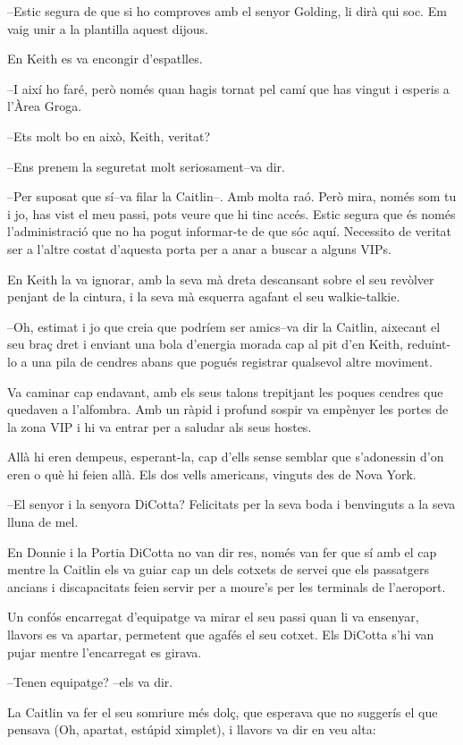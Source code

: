 --Estic segura de que si ho comproves amb el senyor Golding, li dirà qui
soc. Em vaig unir a la plantilla aquest dijous.


En Keith es va encongir d'espatlles.

--I així ho faré, però només quan hagis tornat pel camí que has vingut i
esperis a l'Àrea Groga.

--Ets molt bo en això, Keith, veritat?

--Ens prenem la seguretat molt seriosament--va dir.

--Per suposat que sí--va filar la Caitlin--. Amb molta raó. Però mira,
només som tu i jo, has vist el meu passi, pots veure que hi tinc accés.
Estic segura que és només l'administració que no ha pogut informar-te de
que sóc aquí. Necessito de veritat ser a l'altre costat d'aquesta porta
per a anar a buscar a alguns VIPs.

En Keith la va ignorar, amb la seva mà dreta descansant sobre el seu
revòlver penjant de la cintura, i la seva mà esquerra agafant el seu
walkie-talkie.

--Oh, estimat i jo que creia que podríem ser amics--va dir la Caitlin,
aixecant el seu braç dret i enviant una bola d'energia morada cap al pit
d'en Keith, reduint-lo a una pila de cendres abans que pogués registrar
qualsevol altre moviment.

Va caminar cap endavant, amb els seus talons trepitjant les poques
cendres que quedaven a l'alfombra. Amb un ràpid i profund sospir va
empènyer les portes de la zona VIP i hi va entrar per a saludar als seus
hostes.

Allà hi eren dempeus, esperant-la, cap d'ells sense semblar que
s'adonessin d'on eren o què hi feien allà. Els dos vells americans,
vinguts des de Nova York.

--El senyor i la senyora DiCotta? Felicitats per la seva boda i
benvinguts a la seva lluna de mel.

En Donnie i la Portia DiCotta no van dir res, només van fer que sí amb
el cap mentre la Caitlin els va guiar cap un dels cotxets de servei que
els passatgers ancians i discapacitats feien servir per a moure's per
les terminals de l'aeroport.

Un confós encarregat d'equipatge va mirar el seu passi quan li va
ensenyar, llavors es va apartar, permetent que agafés el seu cotxet. Els
DiCotta s'hi van pujar mentre l'encarregat es girava.

--Tenen equipatge? --els va dir.

La Caitlin va fer el seu somriure més dolç, que esperava que no suggerís
el que pensava (Oh, apartat, estúpid ximplet), i llavors va dir en veu
alta:

